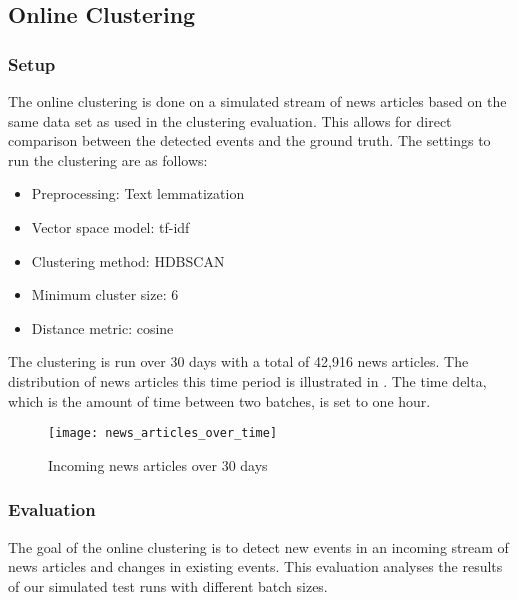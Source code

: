 \subsection{Online Clustering}
\label{subsec:5b_online_clustering}

\subsubsection{Setup}
\label{subsubsec:5b_setup}

The online clustering is done on a simulated stream of news articles
based on the same data set as used in the clustering evaluation.
This allows for direct comparison between the detected events and the ground truth.
The settings to run the clustering are as follows:

\begin{itemize}
    \item Preprocessing: Text lemmatization
    \item Vector space model: tf-idf
    \item Clustering method: HDBSCAN
    \item Minimum cluster size: 6
    \item Distance metric: cosine
\end{itemize}

The clustering is run over 30 days with a total of 42,916 news articles.
The distribution of news articles this time period is illustrated in .
The time delta, which is the amount of time between two batches, is set to one hour.

\begin{figure}[h]
    \centering
    \texttt{[image: news\_articles\_over\_time]}
    \caption{Incoming news articles over 30 days}
    \label{fig:news_articles_over_time}
\end{figure}

\subsubsection{Evaluation}
\label{subsubsec:5b_evaluation}

The goal of the online clustering is to detect new events in an incoming stream
of news articles and changes in existing events.
This evaluation analyses the results of our simulated test runs with different batch sizes.

